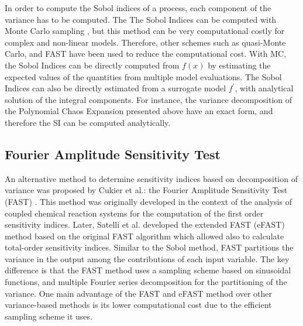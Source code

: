 \documentclass[12pt]{article}
\begin{document}
{\vspace{0.5cm}

In order to compute the Sobol indices of a process, each component of the variance has to be computed. The The Sobol Indices can be computed with Monte Carlo sampling \cite{SOBOL1993,SALTELLI2002280}, but this method can be very computational costly for complex and non-linear models. Therefore, other schemes such as quasi-Monte Carlo, and FAST \cite{CUKIER19781,SaltelliFAST} have been used to reduce the computational cost.  
With MC, the Sobol Indices can be directly computed from $f(x)$ by estimating the expected values of the quantities from multiple model evaluations.
The Sobol Indices can also be directly estimated from a surrogate model $f^{\prime}$, with analytical solution of the integral components. For instance, the variance decomposition of the Polynomial Chaos Expansion presented above have an exact form, and therefore the SI can be computed analytically.


\subsection{Fourier Amplitude Sensitivity Test}

An alternative method to determine sensitivity indices based on decomposition of variance was proposed  by Cukier et al.: the Fourier Amplitude Sensitivity Test (FAST) \cite{Cukier1973,CUKIER19781}. This method was originally developed in the context of the analysis of coupled chemical reaction systems for the computation of the first order sensitivity indices. Later, Satelli et al. \cite{SaltelliFAST} developed the extended FAST (eFAST) method based on the original FAST algorithm which allowed also to calculate total-order sensitivity indices. 
Similar to the Sobol method, FAST partitions the variance in the output  among the contributions of each input variable. The key difference is that the FAST method uses a sampling scheme based on sinusoidal functions, and multiple Fourier series decomposition for the partitioning of the variance. One main advantage of the FAST and eFAST method over other variance-based methods is its lower computational cost due to the efficient sampling scheme it uses. 

}
\end{document}
